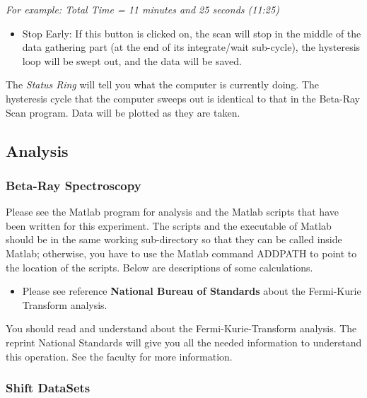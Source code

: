 \documentclass{../lab}
\begin{document}
\emph{For example: Total Time = 11 minutes and 25 seconds (11:25)}

\begin{itemize}
    \item Stop Early: If this button is clicked on, the scan will stop in the middle of the data gathering part (at the end of its integrate/wait sub-cycle), the hysteresis loop will be swept out, and the data will be saved.

\end{itemize}

The \emph{Status Ring} will tell you what the computer is currently doing. The hysteresis cycle that the computer sweeps out is identical to that in the Beta-Ray Scan program. Data will be plotted as they are taken.

\subsection{Analysis}

\subsubsection{Beta-Ray Spectroscopy}

Please see the Matlab program for analysis and the Matlab scripts that have been written for this experiment. The scripts and the executable of Matlab should be in the same working sub-directory so that they can be called inside Matlab; otherwise, you have to use the Matlab command ADDPATH to point to the location of the scripts. Below are descriptions of some calculations.

\begin{itemize}
    \item Please see reference \textbf{National Bureau of Standards} about the Fermi-Kurie Transform analysis.

\end{itemize}

You should read and understand about the Fermi-Kurie-Transform analysis. The reprint National Standards will give you all the needed information to understand this operation. See the faculty for more information.

\subsubsection{Shift DataSets}
\end{document}

